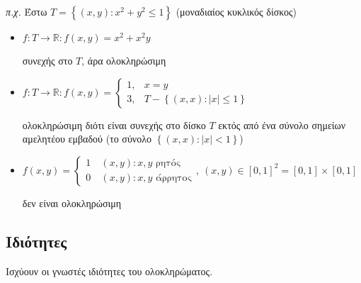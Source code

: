 \documentclass[11pt,a4paper,titlepage]{article}
\begin{document}
\textit{π.χ.}
Έστω \( T =  \left\lbrace (x,y): x^2+y^2 \leq 1  \right\rbrace\) (μοναδιαίος κυκλικός δίσκος)

\begin{itemize}
\item \(f:T \to \mathbb{R}: f(x,y)=x^2+x^2y\)

συνεχής στο \(T\), άρα ολοκληρώσιμη
\item \(f:T\to \mathbb R : f(x,y) = \begin{cases}1,&x=y\\3,&T- \left\lbrace (x,x):|x| \leq 1 \right\rbrace \end{cases}\) %

ολοκληρώσιμη διότι είναι συνεχής στο δίσκο \(T\) εκτός από ένα σύνολο σημείων αμελητέου εμβαδού (το σύνολο \( \left\lbrace (x,x): |x|<1 \right\rbrace\))

\item \(f(x,y) = \begin{cases}1 \ & (x,y): x,y \text{ ρητός}
\\
0& (x,y): x,y \text{ άρρητος}
\end{cases},\ (x,y) \in [0,1]^2 = [0,1] \times [0,1]
\)

δεν είναι ολοκληρώσιμη
\end{itemize}

\subsection{Ιδιότητες}

Ισχύουν οι γνωστές ιδιότητες του ολοκληρώματος.
\end{document}
